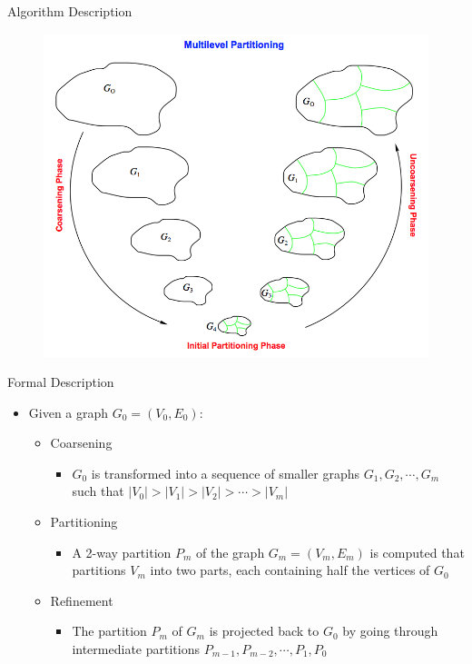 \documentclass{beamer}
\begin{document}
\begin{frame}{Algorithm Description}
  \begin{center}
  \begin{figure}[htbp]
      \includegraphics[scale=.5]{img/metis.png}
  \end{figure}
  \end{center}
\end{frame}

\begin{frame}{Formal Description}

\begin{itemize}
  \item Given a graph $G_0 = (V_0,E_0)$:
  \begin{itemize}    
    \item Coarsening
    \begin{itemize}
      \item $G_0$ is transformed into a sequence of smaller graphs $G_1,G_2,\cdots,G_m$ such that $|V_0|>|V_1|>|V_2|>\cdots>|V_m|$
    \end{itemize}
    \item Partitioning 
    \begin{itemize}
      \item A 2-way partition $P_m$ of the graph $G_m = (V_m,E_m)$ is computed that partitions $V_m$ into two parts, each containing half the vertices of $G_0$
    \end{itemize}
    \item Refinement
    \begin{itemize}
      \item The partition $P_m$ of $G_m$ is projected back to $G_0$ by going through intermediate partitions $P_{m-1}, P_{m-2},\cdots,P_1,P_0 $
    \end{itemize}
  \end{itemize}
\end{itemize}
  
\end{frame}
\end{document}
